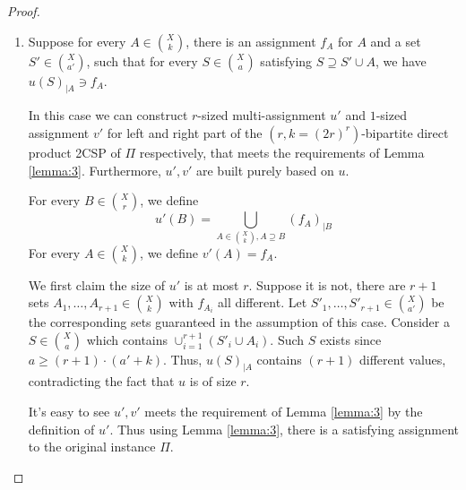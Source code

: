 \documentclass[10pt,a4paper]{article}
\begin{document}
\begin{proof}
\begin{enumerate}
    Given $a \ge k$ and $b \ge r\cdot b'+a$, we can apply Lemma \ref{lemma:2} to know that there is an assignment $f_A$ on $A$, such that for every $T' \in \binom{X}{b'}$, there is $T \in \binom{X}{b}$ satisfying $T \supseteq T'\cup A$ and $v(T)_{|A}\ni f_A$.

    We therefore build multi-assignments $u',v'$ for the smaller $(a',b')$-bipartite 2CSP instance as follows.

    For every $S' \in \binom{X}{a'}$, we pick the set $S$ guaranteed by the assumption of this case, and define $u'(S')=u(S)_{|S'}$. Note that $u'$ still has size at most $r$.

    For every $T' \in \binom{X}{b'}$, we pick the set $T$ guaranteed by Lemma \ref{lemma:2}, and define $v'(T')=\{\sigma \in v(T)| \sigma_{|A} \neq f_A\}_{|T'}$. By the assumption, there exists $S \in \binom{X}{a}$ satisfying $S \supseteq A$ and $u(S)_{|A}\not\ni f_A$. Thus to be consistent with $u(S)_{|A}$, we can conclude for every $T \in \binom{X}{b}$ containing $A$, $v(T)_{|A}$ should also contain some value other than $f_A$. Therefore, our constructed $v'$ is non-empty and has size at most $q-1$.

    It's also easy to see $u',v'$ still satisfy list consistency, since in $v'$ we only discard the assignments whose restriction on $A$ equals to $f_A$, which are not consistent with any $u'$.
    
    \item Suppose for every $A \in \binom{X}{k}$, there is an assignment $f_A$ for $A$ and a set $S' \in \binom{X}{a'}$, such that for every $S \in \binom{X}{a}$ satisfying $S \supseteq S' \cup A$, we have $u(S)_{|A}\ni f_A$.

    In this case we can construct $r$-sized multi-assignment $u'$ and $1$-sized assignment $v'$ for left and right part of the $(r,k=(2r)^r)$-bipartite direct product 2CSP of $\Pi$ respectively, that meets the requirements of Lemma \ref{lemma:3}. Furthermore, $u',v'$ are built purely based on $u$.

    For every $B \in \binom{X}{r}$, we define
    \[
    u'(B)=\bigcup_{A \in \binom{X}{k},A \supseteq B} (f_A)_{|B}
    \]
    For every $A \in \binom{X}{k}$, we define $v'(A)=f_A$.
    
    We first claim the size of $u'$ is at most $r$. Suppose it is not, there are $r+1$ sets $A_1,\ldots,A_{r+1} \in \binom{X}{k}$ with $f_{A_i}$ all different. Let $S'_1,\ldots,S'_{r+1}\in\binom{X}{a'}$ be the corresponding sets guaranteed in the assumption of this case. Consider a $S \in \binom{X}{a}$ which contains $\cup_{i=1}^{r+1}(S'_i \cup A_i)$. Such $S$ exists since $a \ge (r+1)\cdot (a'+k)$. Thus, $u(S)_{|A}$ contains $(r+1)$ different values, contradicting the fact that $u$ is of size $r$.

    It's easy to see $u',v'$ meets the requirement of Lemma \ref{lemma:3} by the definition of $u'$. Thus using Lemma \ref{lemma:3}, there is a satisfying assignment to the original instance $\Pi$. \qedhere
\end{enumerate}
\end{proof}
\end{document}
